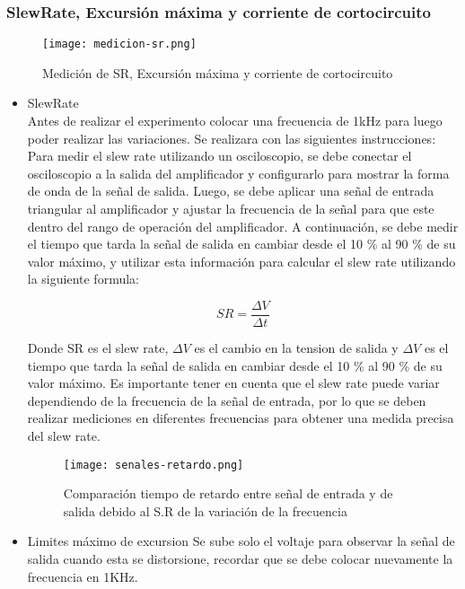 \subsubsection{SlewRate, Excursión máxima y corriente de cortocircuito}

\begin{figure}[ht]
    \centering
    \texttt{[image: medicion-sr.png]}
    \caption{Medición de SR, Excursión máxima y corriente de cortocircuito}
    \label{fig:medicion-sr}
\end{figure}

\begin{itemize}
    \item SlewRate \\
    Antes de realizar el experimento colocar una frecuencia de 1kHz para luego poder realizar las variaciones. Se realizara con las siguientes instrucciones: Para medir el slew rate utilizando un osciloscopio, se debe conectar el osciloscopio a la salida del amplificador y configurarlo para mostrar la forma de onda de la señal de salida. Luego, se debe aplicar una señal de entrada triangular al amplificador y ajustar la frecuencia de la señal para que este dentro del rango de operación del amplificador. A continuación, se debe medir el tiempo que tarda la señal de salida en cambiar desde el 10 \% al 90 \% de su valor máximo, y utilizar esta información para calcular el slew rate utilizando la siguiente formula:

    $$SR = \frac{\Delta V}{\Delta t}$$

    Donde SR es el slew rate, $\Delta V$ es el cambio en la tension de salida y $\Delta V$ es el tiempo que tarda la señal de salida en cambiar desde el 10 \% al 90 \% de su valor máximo. Es importante tener en cuenta que el slew rate puede variar dependiendo de la frecuencia de la señal de entrada, por lo que se deben realizar mediciones en diferentes frecuencias para obtener una medida precisa del slew rate.

    \begin{figure}[ht]
        \centering
        \texttt{[image: senales-retardo.png]}
        \caption{Comparación tiempo de retardo entre señal de entrada y de salida debido al S.R de la variación de la frecuencia}
        \label{fig:comparacion-funciones-sr}
    \end{figure}

    \item Limites máximo de excursion
    Se sube solo el voltaje para observar la señal de salida cuando esta se distorsione, recordar que se debe colocar nuevamente la frecuencia en 1KHz.


\end{itemize}
